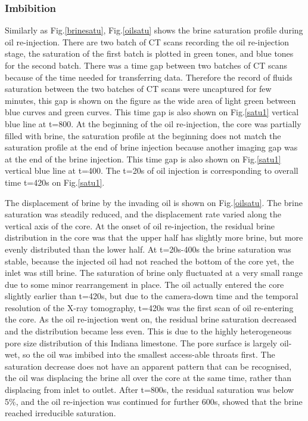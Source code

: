 \subsubsection{Imbibition}
Similarly as Fig.\ref{brinesatu}, Fig.\ref{oilsatu} shows the brine saturation profile during oil re-injection. There are two batch of CT scans recording the oil re-injection stage, the saturation of the first batch is plotted in green tones, and blue tones for the second batch. There was a time gap between two batches of CT scans because of the time needed for transferring data. Therefore the record of fluids saturation between the two batches of CT scans were uncaptured for few minutes, this gap is shown on the figure as the wide area of light green between blue curves and green curves. This time gap is also shown on Fig.\ref{satu1} vertical blue line at t=800. At the beginning of the oil re-injection, the core was partially filled with brine, the saturation profile at the beginning does not match the saturation profile at the end of brine injection because another imaging gap was at the end of the brine injection. This time gap is also shown on Fig.\ref{satu1} vertical blue line at t=400. The t=20s of oil injection is corresponding to overall time t=420s on Fig.\ref{satu1}.

The displacement of brine by the invading oil is shown on Fig.\ref{oilsatu}. The brine saturation was steadily reduced, and the displacement rate varied along the vertical axis of the core. At the onset of oil re-injection, the residual brine distribution in the core was that the upper half has slightly more brine, but more evenly distributed than the lower half. At t=20s-400s the brine saturation was stable, because the injected oil had not reached the bottom of the core yet, the inlet was still brine. The saturation of brine only fluctuated at a very small range due to some minor rearrangement in place. The oil actually entered the core slightly earlier than t=420s, but due to the camera-down time and the temporal resolution of the X-ray tomography, t=420s was the first scan of oil re-entering the core. As the oil re-injection went on, the residual brine saturation decreased and the distribution became less even. This is due to the highly heterogeneous pore size distribution of this Indiana limestone. The pore surface is largely oil-wet, so the oil was imbibed into the smallest access-able throats first. The saturation decrease does not have an apparent pattern that can be recognised, the oil was displacing the brine all over the core at the same time, rather than displacing from inlet to outlet. After t=800s, the residual saturation was below 5\%, and the oil re-injection was continued for further 600s, showed that the brine reached irreducible saturation.  

